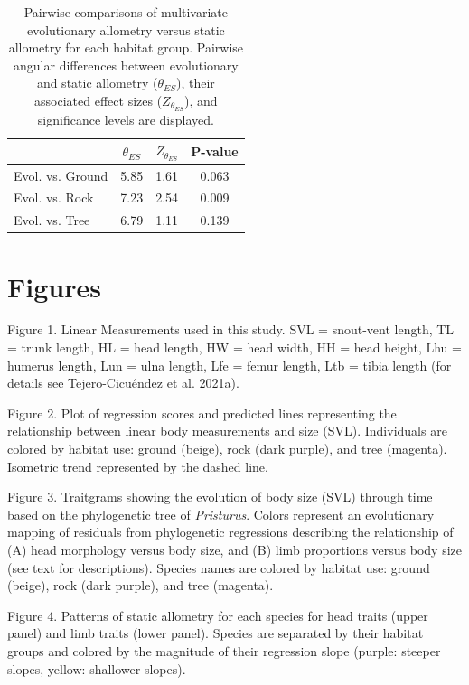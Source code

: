 \documentclass[
  11pt,
]{article}
\begin{document}
\begin{table}[H]

\caption{\label{tab:unnamed-chunk-3}Pairwise comparisons of multivariate evolutionary allometry versus static allometry for each habitat group. Pairwise angular differences between evolutionary and static allometry ($\theta_{ES}$), their associated effect sizes ($Z_{\theta_{ES}}$), and significance levels are displayed.}
\centering
\begin{tabular}[t]{lccc}
\toprule
  & $\theta_{ES}$ & $Z_{\theta_{ES}}$ & P-value\\
\midrule
Evol. vs. Ground & 5.85 & 1.61 & 0.063\\
Evol. vs. Rock & 7.23 & 2.54 & 0.009\\
Evol. vs. Tree & 6.79 & 1.11 & 0.139\\
\bottomrule
\end{tabular}
\end{table}

\newpage

\hypertarget{figures}{%
\section{Figures}\label{figures}}

Figure 1. Linear Measurements used in this study. SVL = snout-vent
length, TL = trunk length, HL = head length, HW = head width, HH = head
height, Lhu = humerus length, Lun = ulna length, Lfe = femur length, Ltb
= tibia length (for details see Tejero-Cicuéndez et al. 2021a).

Figure 2. Plot of regression scores and predicted lines representing the
relationship between linear body measurements and size (SVL).
Individuals are colored by habitat use: ground (beige), rock (dark
purple), and tree (magenta). Isometric trend represented by the dashed
line.

Figure 3. Traitgrams showing the evolution of body size (SVL) through
time based on the phylogenetic tree of \emph{Pristurus}. Colors
represent an evolutionary mapping of residuals from phylogenetic
regressions describing the relationship of (A) head morphology versus
body size, and (B) limb proportions versus body size (see text for
descriptions). Species names are colored by habitat use: ground (beige),
rock (dark purple), and tree (magenta).

Figure 4. Patterns of static allometry for each species for head traits
(upper panel) and limb traits (lower panel). Species are separated by
their habitat groups and colored by the magnitude of their regression
slope (purple: steeper slopes, yellow: shallower slopes).
\end{document}
